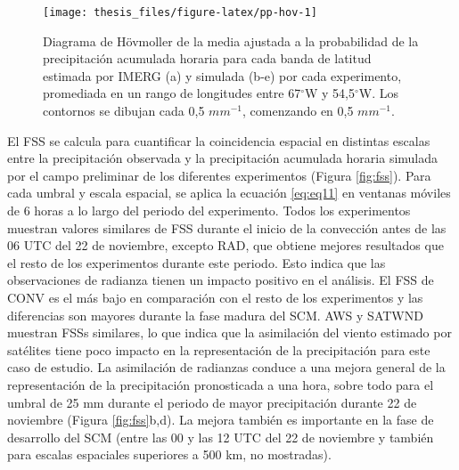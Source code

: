 \documentclass[12pt,oneside,a4paper]{reedthesis}
\begin{document}
\begin{figure}

{\centering \texttt{[image: thesis\_files/figure-latex/pp-hov-1]} 

}

\caption{Diagrama de Hövmoller de la media ajustada a la probabilidad de la precipitación acumulada horaria para cada banda de latitud estimada por IMERG (a) y simulada (b-e) por cada experimento, promediada en un rango de longitudes entre 67\(^{\circ}\)W y 54,5\(^{\circ}\)W. Los contornos se dibujan cada 0,5 \(mm^{-1}\), comenzando en 0,5 \(mm^{-1}\).}\label{fig:pp-hov}
\end{figure}
El FSS se calcula para cuantificar la coincidencia espacial en distintas escalas entre la precipitación observada y la precipitación acumulada horaria simulada por el campo preliminar de los diferentes experimentos (Figura \ref{fig:fss}). Para cada umbral y escala espacial, se aplica la ecuación \eqref{eq:eq11} en ventanas móviles de 6 horas a lo largo del periodo del experimento. Todos los experimentos muestran valores similares de FSS durante el inicio de la convección antes de las 06 UTC del 22 de noviembre, excepto RAD, que obtiene mejores resultados que el resto de los experimentos durante este periodo. Esto indica que las observaciones de radianza tienen un impacto positivo en el análisis. El FSS de CONV es el más bajo en comparación con el resto de los experimentos y las diferencias son mayores durante la fase madura del SCM. AWS y SATWND muestran FSSs similares, lo que indica que la asimilación del viento estimado por satélites tiene poco impacto en la representación de la precipitación para este caso de estudio. La asimilación de radianzas conduce a una mejora general de la representación de la precipitación pronosticada a una hora, sobre todo para el umbral de 25 mm durante el periodo de mayor precipitación durante 22 de noviembre (Figura \ref{fig:fss}b,d). La mejora también es importante en la fase de desarrollo del SCM (entre las 00 y las 12 UTC del 22 de noviembre y también para escalas espaciales superiores a 500 km, no mostradas).
\end{document}

